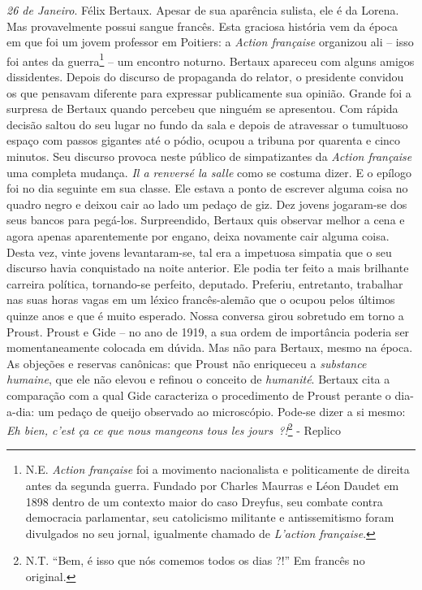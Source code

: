 \emph{26 de Janeiro}. Félix Bertaux. Apesar de sua aparência sulista,
ele é da Lorena. Mas provavelmente possui sangue francês. Esta graciosa
história vem da época em que foi um jovem professor em Poitiers: a
\emph{Action française} organizou ali -- isso foi antes da
guerra\footnote{N.E. \emph{Action française} foi a movimento
  nacionalista e politicamente de direita antes da segunda guerra.
  Fundado por Charles Maurras e Léon Daudet em 1898 dentro de um
  contexto maior do caso Dreyfus, seu combate contra democracia
  parlamentar, seu catolicismo militante e antissemitismo foram
  divulgados no seu jornal, igualmente chamado de \emph{L'action
  française}.} -- um encontro noturno. Bertaux apareceu com alguns
amigos dissidentes. Depois do discurso de propaganda do relator, o
presidente convidou os que pensavam diferente para expressar
publicamente sua opinião. Grande foi a surpresa de Bertaux quando
percebeu que ninguém se apresentou. Com rápida decisão saltou do seu
lugar no fundo da sala e depois de atravessar o tumultuoso espaço com
passos gigantes até o pódio, ocupou a tribuna por quarenta e cinco
minutos. Seu discurso provoca neste público de simpatizantes da
\emph{Action française} uma completa mudança. \emph{Il a renversé la
salle} como se costuma dizer. E o epílogo foi no dia seguinte em sua
classe. Ele estava a ponto de escrever alguma coisa no quadro negro e
deixou cair ao lado um pedaço de giz. Dez jovens jogaram-se dos seus
bancos para pegá-los. Surpreendido, Bertaux quis observar melhor a cena
e agora apenas aparentemente por engano, deixa novamente cair alguma
coisa. Desta vez, vinte jovens levantaram-se, tal era a impetuosa
simpatia que o seu discurso havia conquistado na noite anterior. Ele
podia ter feito a mais brilhante carreira política, tornando-se
perfeito, deputado. Preferiu, entretanto, trabalhar nas suas horas vagas
em um léxico francês-alemão que o ocupou pelos últimos quinze anos e que
é muito esperado. Nossa conversa girou sobretudo em torno a Proust.
Proust e Gide -- no ano de 1919, a sua ordem de importância poderia ser
momentaneamente colocada em dúvida. Mas não para Bertaux, mesmo na
época. As objeções e reservas canônicas: que Proust não enriqueceu a
\emph{substance humaine}, que ele não elevou e refinou o conceito de
\emph{humanité}. Bertaux cita a comparação com a qual Gide caracteriza o
procedimento de Proust perante o dia-a-dia: um pedaço de queijo
observado ao microscópio. Pode-se dizer a si mesmo: \emph{Eh bien, c'est
ça ce que nous mangeons tous les jours~?!}\footnote{N.T. ``Bem, é isso
  que nós comemos todos os dias ?!'' Em francês no original.} - Replico
